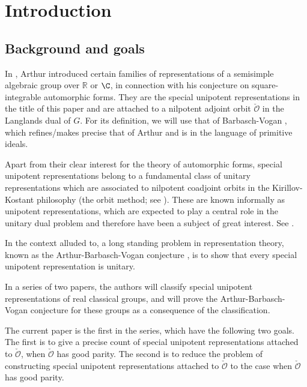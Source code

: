 \documentclass[12pt,a4paper]{amsart}
\newcommand{\CO}{{\mathcal {O}}}
\newcommand{\R}{\mathbb R}
\numberwithin{equation}{section}
\theoremstyle{remark}
\begin{document}
\maketitle



\tableofcontents






\section{Introduction}\label{sec:intro}

\subsection{Background and goals} In \cite{ArPro,ArUni}, Arthur introduced certain families of representations of a semisimple algebraic group over $\R$ or $\C$, in connection with his conjecture on square-integrable automorphic forms. They are the special unipotent representations in the title of this paper and are attached to a nilpotent adjoint orbit $\check \CO$ in the Langlands dual of $G$. For its definition, we will use that of Barbasch-Vogan \cite{BVUni}, which refines/makes precise that of Arthur and is in the language of primitive ideals.

Apart from their clear interest for the theory of automorphic forms, special unipotent representations belong to a fundamental class of unitary representations which are associated to nilpotent coadjoint orbits in
the Kirillov-Kostant philosophy (the orbit method; see \cite{Ki62,Ko70,VoBook}). These are known informally as unipotent representations, which are expected to play a central role in the unitary dual problem and therefore have been a subject of great interest. See \cite{VoICM,VoBook,Vo89}.

In the context alluded to, a long standing problem in representation theory, known as the Arthur-Barbasch-Vogan conjecture \cite[Introduction]{ABV}, is to show that every special unipotent representation is unitary.

In a series of two papers, the authors will classify special unipotent representations of real classical groups, and will prove the Arthur-Barbasch-Vogan conjecture for these groups as a consequence of the classification.

The current paper is the first in the series, which have the following two goals. The first is to give a precise count of special unipotent representations attached to $\check \CO$, when $\check \CO$ has good parity. The second is to reduce the problem of constructing special unipotent representations attached to $\check \CO$ to the case when $\check \CO$ has good parity.
\end{document}
